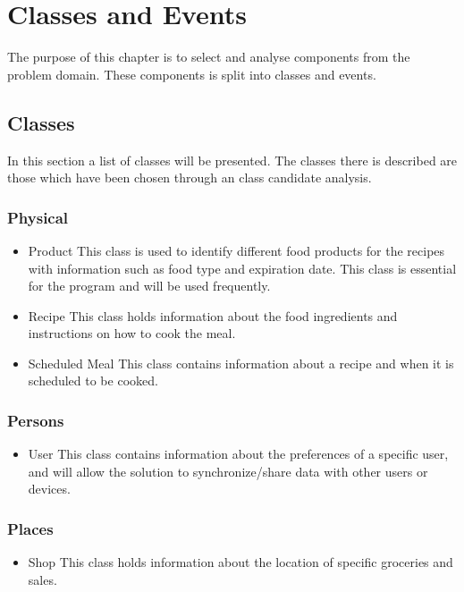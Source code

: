 \section{Classes and Events}
The purpose of this chapter is to select and analyse components from the problem domain. These components is split into classes and events.

\subsection{Classes}
In this section a list of classes will be presented. The classes there is described are those which have been chosen through an class candidate analysis.

\subsubsection{Physical}
\begin{itemize}
\item Product
    \subitem This class is used to identify different food products for the recipes with information such as food type and expiration date. This class is essential for the program and will be used frequently.
\item Recipe
    \subitem This class holds information about the food ingredients and instructions on how to cook the meal.
\item Scheduled Meal
    \subitem This class contains information about a recipe and when it is scheduled to be cooked.
\end{itemize}

\subsubsection{Persons}
\begin{itemize}
\item User
    \subitem This class contains information about the preferences of a specific user, and will allow the solution to synchronize/share data with other users or devices.
\end{itemize}

\subsubsection{Places}
\begin{itemize}
\item Shop
    \subitem This class holds information about the location of specific groceries and sales.
\end{itemize}

